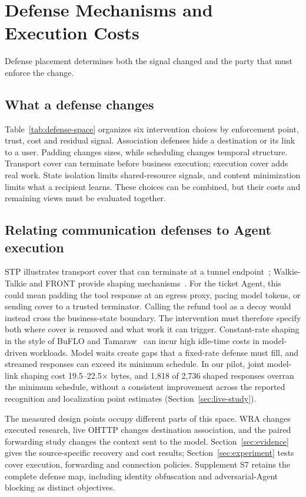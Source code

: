 \section{Defense Mechanisms and Execution Costs}\label{sec:defenses}
Defense placement determines both the signal changed and the party that must enforce the change.
\subsection{What a defense changes}
Table~\ref{tab:defense-space} organizes six intervention choices by enforcement point, trust, cost and residual signal. Association defenses hide a destination or its link to a user. Padding changes sizes, while scheduling changes temporal structure. Transport cover can terminate before business execution; execution cover adds real work. State isolation limits shared-resource signals, and content minimization limits what a recipient learns. These choices can be combined, but their costs and remaining views must be evaluated together.




\subsection{Relating communication defenses to Agent execution}
STP illustrates transport cover that can terminate at a tunnel endpoint~\cite{apthorpe2019stp}; Walkie-Talkie and FRONT provide shaping mechanisms~\cite{wang2017walkietalkie,gong2020front}. For the ticket Agent, this could mean padding the tool response at an egress proxy, pacing model tokens, or sending cover to a trusted terminator. Calling the refund tool as a decoy would instead cross the business-state boundary. The intervention must therefore specify both where cover is removed and what work it can trigger. Constant-rate shaping in the style of BuFLO and Tamaraw~\cite{dyer2012peekaboo,cai2014tamaraw} can incur high idle-time costs in model-driven workloads. Model waits create gaps that a fixed-rate defense must fill, and streamed responses can exceed its minimum schedule. In our pilot, joint model-link shaping cost 19.5--22.5$\times$ bytes, and 1,818 of 2,736 shaped responses overran the minimum schedule, without a consistent improvement across the reported recognition and localization point estimates (Section~\ref{sec:live-study}).

The measured design points occupy different parts of this space. WRA changes executed research, live OHTTP changes destination association, and the paired forwarding study changes the context sent to the model. Section~\ref{sec:evidence} gives the source-specific recovery and cost results; Section~\ref{sec:experiment} tests cover execution, forwarding and connection policies. Supplement S7 retains the complete defense map, including identity obfuscation and adversarial-Agent blocking as distinct objectives.

